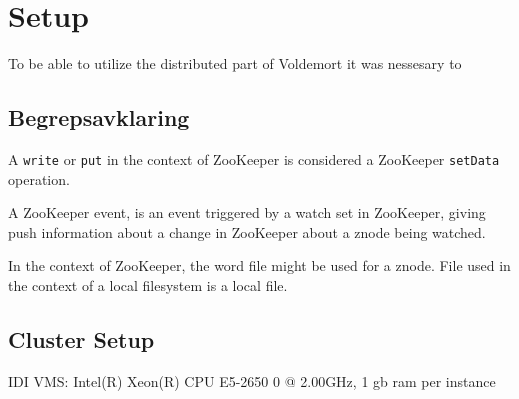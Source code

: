 \section{Setup}
\label{sec:setup}

To be able to utilize the distributed part of Voldemort it was nessesary to 

\subsection{Begrepsavklaring}
A \texttt{write} or \texttt{put} in the context of ZooKeeper is considered a ZooKeeper \texttt{setData} operation.

A ZooKeeper event, is an event triggered by a watch set in ZooKeeper, giving push information about a change in ZooKeeper about a znode being watched.

In the context of ZooKeeper, the word file might be used for a znode. File used in the context of a local filesystem is a local file.

\subsection{Cluster Setup}
IDI VMS:  Intel(R) Xeon(R) CPU E5-2650 0 @ 2.00GHz, 1 gb ram per instance

